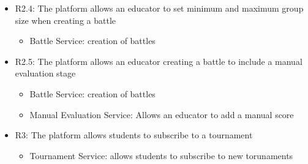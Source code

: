 \begin{itemize}
\item R2.4: The platform allows an educator to set minimum and maximum group size when creating a battle

\begin{itemize}
    \item Battle Service: creation of battles
\end{itemize}

\item R2.5: The platform allows an educator creating a battle to include a manual evaluation stage

\begin{itemize}
    \item Battle Service: creation of battles
    \item Manual Evaluation Service: Allows an educator to add a manual score
\end{itemize}


\item R3:	The platform allows students to subscribe to a tournament

\begin{itemize}
\item Tournament Service: allows students to subscribe to new torunaments
\end{itemize}


\end{itemize}
